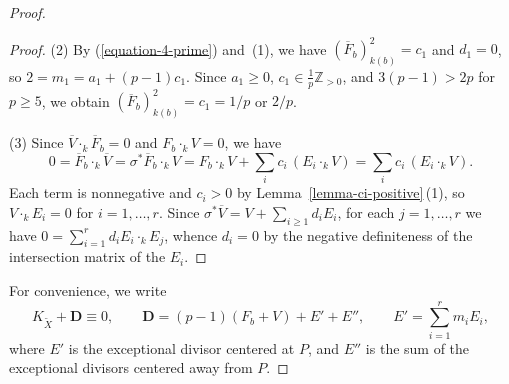 \documentclass[reqno,oneside]{amsart}
\theoremstyle{definition}
\theoremstyle{plain}
\numberwithin{equation}{section}
\begin{document}
\begin{proof}
\begin{proof}
  \medskip
    (2) By (\ref{equation-4-prime}) and~(1), we have $(\overline{F}_b)^2_{k(b)}=c_1$ and $d_1=0$, so
$2=m_1=a_1+(p-1)c_1$.
Since $a_1\ge0$, $c_1\in\frac1p\mathbb{Z}_{>0}$, and $3(p-1) >2p$ for $p\ge5$, we obtain $(\overline{F}_b)^2_{k(b)}=c_1=1/p$ or $2/p$.

\medskip
(3) Since $\overline{V}\cdot_k\overline{F}_b = 0$ and $F_b\cdot_k V = 0$, we have
\[
  0 = \overline F_b\cdot_k\overline V = \sigma^*\overline F_b\cdot_k V = F_b\cdot_k V + \sum_i c_i\,(E_i\cdot_k V) = \sum_i c_i\,(E_i\cdot_k V).
\]
Each term is nonnegative and $c_i>0$ by Lemma~\ref{lemma-ci-positive}\,(1), so $V\cdot_k E_i = 0$ for $i=1,\ldots,r$.
Since $\sigma^*\overline{V} = V+ \sum_{i\geq 1} d_i E_i$, for each $j=1,\ldots,r$ we have $0 = \sum_{i=1}^r d_i E_i \cdot_k E_j$, whence $d_i = 0$ by the negative definiteness of the intersection matrix of the $E_i$.
\end{proof}

For convenience, we write
\begin{equation}\label{equation-disc-can}
  K_{\widetilde X}+\mathbf D\equiv0,\qquad
  \mathbf D = (p-1)(F_b+V)+E'+E'',\qquad
  E'=\sum_{i=1}^r m_iE_i,
\end{equation}
where $E'$ is the exceptional divisor centered at $P$, and $E''$ is the sum of the exceptional divisors centered away from $P$.


\end{proof}
\end{document}

